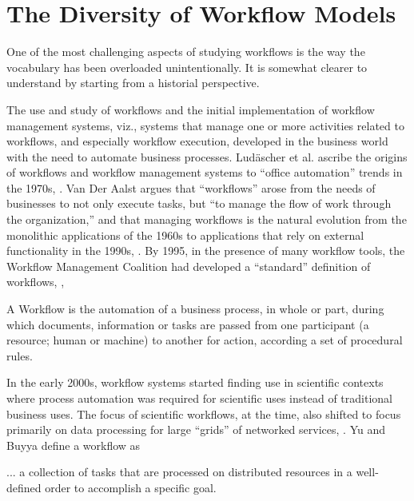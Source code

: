 \section{The Diversity of Workflow Models}\label{workflows}

One of the most challenging aspects of studying
workflows is the way the vocabulary has been overloaded unintentionally.
It is somewhat clearer to understand by starting from a historial
perspective.

The use and study of workflows and the initial implementation of workflow
management systems, viz., systems that manage one or more activities related
to workflows, and especially workflow execution, developed in the business
world with the need to automate business processes. Lud\"{a}scher et al.
ascribe the origins of workflows and workflow management systems to ``office
automation'' trends in the 1970s, \cite{ludascher_scientific_2006}. Van Der
Aalst argues that ``workflows'' arose from the needs of businesses to not only
execute tasks, but ``to manage the flow of work through the organization,''
and that managing workflows is the natural evolution from the monolithic
applications of the 1960s to applications that rely on external functionality
in the 1990s, \cite{van_der_aalst_application_1998}. By 1995, in the presence
of many workflow tools, the Workflow Management Coalition had developed a
``standard'' definition of workflows, \cite{hollingsworth_workflow_1993},

\begin{displayquote}
A Workflow is the automation of a business process, in whole or part, during
which documents, information or tasks are passed from one participant (a 
resource; human or machine) to another for action, according a set of 
procedural rules. 
\end{displayquote}

In the early 2000s, workflow systems started finding use in scientific
contexts where process automation was required for scientific uses
instead of traditional business uses. The focus of scientific workflows,
at the time, also shifted to focus primarily on data processing for
large ``grids'' of networked services, \cite{yu_taxonomy_2005}. Yu and Buyya
define a workflow as

\begin{displayquote}
... a collection of tasks that are processed on distributed resources in a
well-defined order to accomplish a specific goal.
\end{displayquote}

